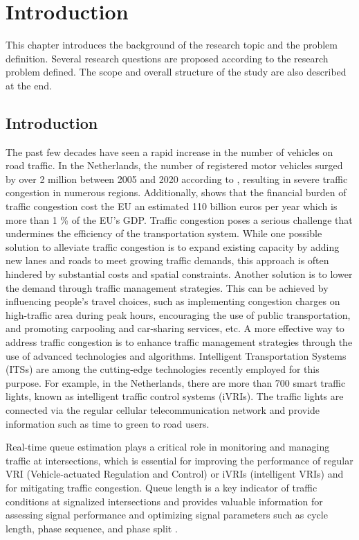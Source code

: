 \chapter{Introduction}
\label{chapter:introduction}

This chapter introduces the background of the research topic and the problem definition.
Several research questions are proposed according to the research problem defined. The
scope and overall structure of the study are also described at the end.
\section{Introduction}
The past few decades have seen a rapid increase in the number of vehicles on road traffic. In the Netherlands, the number of registered motor vehicles surged by over 2 million between 2005 and 2020 according to \textcite{ceicwebsite}, resulting in severe traffic congestion in numerous regions. Additionally, \textcite{panayotis2012roadcongestion} shows that the financial burden of traffic congestion cost the EU an estimated 110 billion euros per year which is more than 1 \% of the EU's GDP. Traffic congestion poses a serious challenge that undermines the efficiency of the transportation system. While one possible solution to alleviate traffic congestion is to expand existing capacity by adding new lanes and roads to meet growing traffic demands, this approach is often hindered by substantial costs and spatial constraints. Another solution is to lower the demand through traffic management strategies. This can be achieved by influencing people's travel choices, such as implementing congestion charges on high-traffic area during peak hours, encouraging the use of public transportation, and promoting carpooling and car-sharing services, etc. A more effective way to address traffic congestion is to enhance traffic management strategies through the use of advanced technologies and algorithms. Intelligent Transportation Systems (ITSs) are among the cutting-edge technologies recently employed for this purpose. For example, in the Netherlands, there are more than 700 smart traffic lights, known as intelligent traffic control systems (iVRIs). The traffic lights are connected via the regular cellular telecommunication network and provide information such as time to green to road users. 


Real-time queue estimation plays a critical role in monitoring and managing traffic at intersections, which is essential for improving the performance of regular VRI (Vehicle-actuated Regulation and Control) or iVRIs (intelligent VRIs) and for mitigating traffic congestion. Queue length is a key indicator of traffic conditions at signalized intersections and provides valuable information for assessing signal performance and optimizing signal parameters such as cycle length, phase sequence, and phase split \textcite{gazis1964optimum}.

